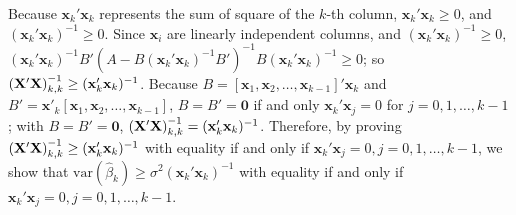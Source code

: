 \documentclass[10pt]{report}
\DeclarePairedDelimiter\autoparen{(}{)}
\newcommand{\pa}[1]{\autoparen*{#1}}
\newcommand{\var} {\text{var}}
\newcommand{\m}[1] {\mathbf{#1}}
\begin{document}
Because $\m{x}_k' \m{x}_k$ represents the sum of square of the $k$-th column, $\m{x}_k' \m{x}_k\ge 0$, and $(\m{x}_k' \m{x}_k)^{-1}\ge 0$. 
Since $\m{x}_i$ are linearly independent columns, and $(\m{x}_k' \m{x}_k)^{-1}\ge 0$, $(\m{x}_k' \m{x}_k)^{-1} B'(A-B(\m{x}_k' \m{x}_k)^{-1}B')^{-1} B(\m{x}_k' \m{x}_k)^{-1}\ge 0$; so $\pa{\m{X}' \m{X}}^{-1}_{k,k} \ge (\m{x}_k' \m{x}_k)^{-1}$. 
Because $B = [\m{x}_1, \m{x}_2, \dots ,\m{x}_{k-1}]'\m{x}_k$ and $B' = \m{x}'_k [\m{x}_1, \m{x}_2, \dots ,\m{x}_{k-1}]$, $B=B'=\m{0}$ if and only $\m{x}_k' \m{x}_j = 0$ for $j=0,1,\dots,k-1$; with $B=B'=\m{0}$, $\pa{\m{X}' \m{X}}^{-1}_{k,k} = (\m{x}_k' \m{x}_k)^{-1}$. 
Therefore, by proving $\pa{\m{X}' \m{X}}^{-1}_{k,k} \ge (\m{x}_k' \m{x}_k)^{-1}$ with equality if and only if $\m{x}_k' \m{x}_j = 0, j=0,1,\dots,k-1$, we show that $\var(\hat{\beta}_k) \ge \sigma^2(\m{x}_k' \m{x}_k)^{-1}$ with equality if and only if $\m{x}_k' \m{x}_j = 0, j=0,1,\dots,k-1$.
\end{document}
